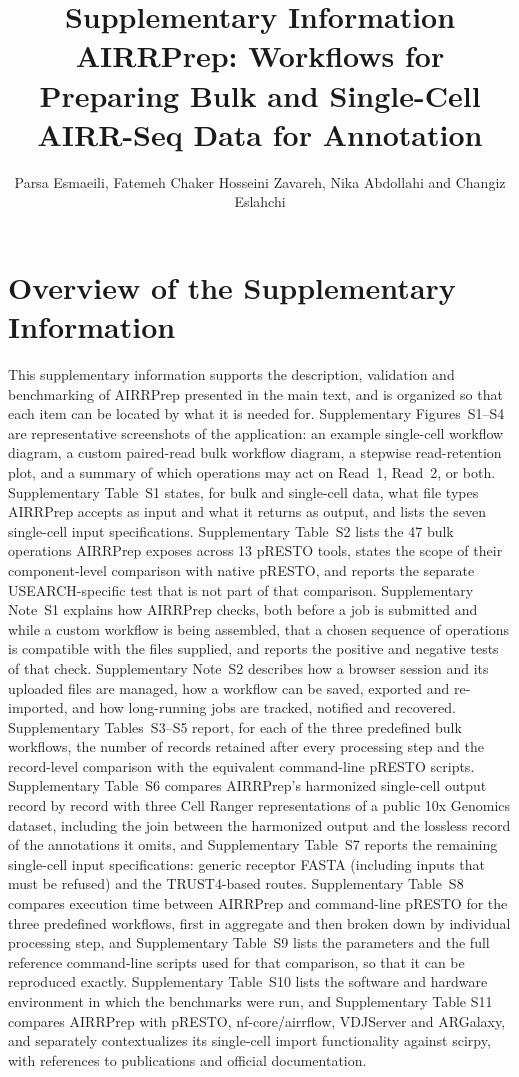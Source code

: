 \documentclass[11pt]{article}
\title{Supplementary Information\\AIRRPrep: Workflows for Preparing Bulk and Single-Cell AIRR-Seq Data for Annotation}
\author{
Parsa Esmaeili,
Fatemeh Chaker Hosseini Zavareh,
Nika Abdollahi and
Changiz Eslahchi
}
\date{}
\begin{document}
\renewcommand{\thefigure}{S\arabic{figure}}
\maketitle

\section*{Overview of the Supplementary Information}

This supplementary information supports the description, validation and
benchmarking of AIRRPrep presented in the main text, and is organized so that
each item can be located by what it is needed for. Supplementary
Figures~S1--S4 are representative screenshots of the application: an example
single-cell workflow diagram, a custom paired-read bulk workflow diagram, a
stepwise read-retention plot, and a summary of which operations may act on
Read~1, Read~2, or both. Supplementary Table~S1 states, for bulk and
single-cell data, what file types AIRRPrep accepts as input and what it
returns as output, and lists the seven single-cell input specifications.
Supplementary Table~S2 lists the 47 bulk operations AIRRPrep exposes across
13 pRESTO tools, states the scope of their component-level comparison with
native pRESTO, and reports the separate USEARCH-specific test that is not part
of that comparison. Supplementary Note~S1 explains how AIRRPrep checks, both before
a job is submitted and while a custom workflow is being assembled, that a
chosen sequence of operations is compatible with the files supplied, and
reports the positive and negative tests of that check. Supplementary Note~S2
describes how a browser session and its uploaded files are managed, how a
workflow can be saved, exported and re-imported, and how long-running jobs
are tracked, notified and recovered. Supplementary Tables~S3--S5 report, for
each of the three predefined bulk workflows, the number of records retained
after every processing step and the record-level comparison with the
equivalent command-line pRESTO scripts. Supplementary Table~S6 compares
AIRRPrep's harmonized single-cell output record by record with three Cell
Ranger representations of a public 10x Genomics dataset, including the join
between the harmonized output and the lossless record of the annotations it
omits, and Supplementary Table~S7 reports the remaining single-cell input
specifications: generic receptor FASTA (including inputs that must be refused)
and the TRUST4-based routes.
Supplementary Table~S8 compares execution time between AIRRPrep and
command-line pRESTO for the three predefined workflows, first in aggregate
and then broken down by individual processing step, and Supplementary
Table~S9 lists the parameters and the full reference command-line scripts
used for that comparison, so that it can be reproduced exactly. Supplementary
Table~S10 lists the software and hardware environment in which the benchmarks
were run, and Supplementary Table S11 compares AIRRPrep with pRESTO,
nf-core/airrflow, VDJServer and ARGalaxy, and separately
contextualizes its single-cell import functionality against
scirpy, with references to publications and official documentation.
\end{document}
